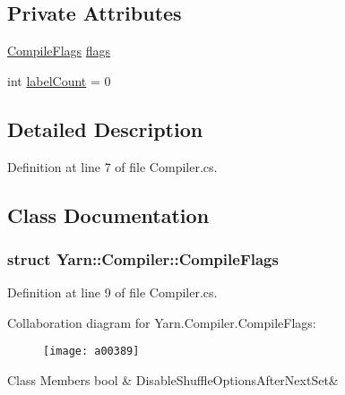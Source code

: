 \subsection*{Private Attributes}
\begin{DoxyCompactItemize}
\item 
\hyperlink{a00054_a00375}{Compile\-Flags} \hyperlink{a00054_a541022d89bcf9bc8f794eb6d6b438d08}{flags}
\item 
int \hyperlink{a00054_a87758397eba2e84cda8e0d6c40656f3f}{label\-Count} = 0
\end{DoxyCompactItemize}


\subsection{Detailed Description}


Definition at line 7 of file Compiler.\-cs.



\subsection{Class Documentation}
\label{a00375}
\hypertarget{a00054_a00375}{}
\subsubsection{struct Yarn\-:\-:Compiler\-:\-:Compile\-Flags}


Definition at line 9 of file Compiler.\-cs.



Collaboration diagram for Yarn.\-Compiler.\-Compile\-Flags\-:
\nopagebreak
\begin{figure}[H]
\begin{center}
\leavevmode
\texttt{[image: a00389]}
\end{center}
\end{figure}
\begin{DoxyFields}{Class Members}
\hypertarget{a00054_a8b49bb7763ff477cba21d7c771ef3ed0}{bool}\label{a00054_a8b49bb7763ff477cba21d7c771ef3ed0}
&
Disable\-Shuffle\-Options\-After\-Next\-Set&
\\
\hline

\end{DoxyFields}


